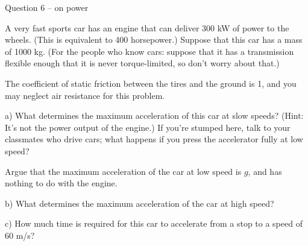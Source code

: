 \documentclass[12pt]{article}
\begin{document}
\newpage
\centerline{\large Question 6 -- on power}

A very fast sports car has an engine that can deliver 300 kW of power to the wheels. (This is equivalent to 400 horsepower.) 
Suppose that this car has a mass of 1000 kg. (For the people who know cars: suppose that it has a transmission flexible enough
that it is never torque-limited, so don't worry about that.)

The coefficient of static friction between the tires and the ground is 1, and you may neglect air resistance for this problem.

a) What determines the maximum acceleration of this car at slow speeds? (Hint: It's not the power output of the engine.) If 
you're stumped here, talk to your classmates who drive cars; what happens if you press the accelerator fully at low speed?

Argue that the maximum acceleration of the car at low speed is $g$, and has nothing to do with the engine.

\vspace{2in}

b) What determines the maximum acceleration of the car at high speed? 

\vspace{2in}

c) How much time is required for this car to accelerate from a stop to a speed of 60 m/s? 

\vspace{2in}
\end{document}
